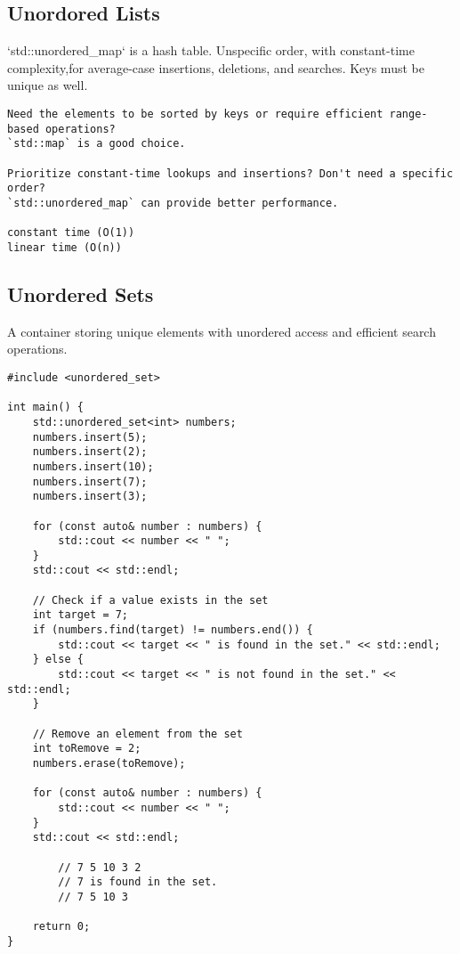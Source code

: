 \subsection{Unordored Lists}

`std::unordered\_map` is a hash table. 
Unspecific order, with constant-time complexity,for average-case 
insertions, deletions, and searches. 
Keys must be unique as well.

\begin{verbatim}
Need the elements to be sorted by keys or require efficient range-based operations?
`std::map` is a good choice.

Prioritize constant-time lookups and insertions? Don't need a specific order? 
`std::unordered_map` can provide better performance.

constant time (O(1)) 
linear time (O(n))
\end{verbatim}

\subsection{Unordered Sets}

A container storing unique elements with unordered access and efficient search operations.

\begin{verbatim}
#include <unordered_set>

int main() {
    std::unordered_set<int> numbers;
    numbers.insert(5);
    numbers.insert(2);
    numbers.insert(10);
    numbers.insert(7);
    numbers.insert(3);

    for (const auto& number : numbers) {
        std::cout << number << " ";
    }
    std::cout << std::endl;

    // Check if a value exists in the set
    int target = 7;
    if (numbers.find(target) != numbers.end()) {
        std::cout << target << " is found in the set." << std::endl;
    } else {
        std::cout << target << " is not found in the set." << std::endl;
    }

    // Remove an element from the set
    int toRemove = 2;
    numbers.erase(toRemove);

    for (const auto& number : numbers) {
        std::cout << number << " ";
    }
    std::cout << std::endl;

        // 7 5 10 3 2
        // 7 is found in the set.
        // 7 5 10 3

    return 0;
}
\end{verbatim}

